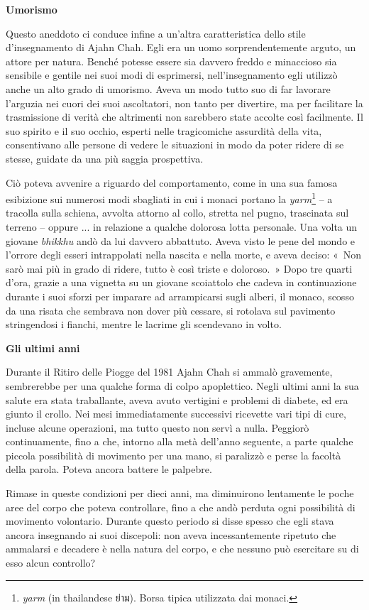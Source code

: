 \textbf{Umorismo}

Questo aneddoto ci conduce infine a un'altra caratteristica dello stile
d'insegnamento di Ajahn Chah. Egli era un uomo sorprendentemente arguto,
un attore per natura. Benché potesse essere sia davvero freddo e
minaccioso sia sensibile e gentile nei suoi modi di esprimersi,
nell'insegnamento egli utilizzò anche un alto grado di umorismo. Aveva
un modo tutto suo di far lavorare l'arguzia nei cuori dei suoi
ascoltatori, non tanto per divertire, ma per facilitare la trasmissione
di verità che altrimenti non sarebbero state accolte così facilmente. Il
suo spirito e il suo occhio, esperti nelle tragicomiche assurdità della
vita, consentivano alle persone di vedere le situazioni in modo da poter
ridere di se stesse, guidate da una più saggia prospettiva.

Ciò poteva avvenire a riguardo del comportamento, come in una sua famosa
esibizione sui numerosi modi sbagliati in cui i monaci portano la
\emph{yarm}\footnote{\emph{yarm} (in thailandese ย่าม). Borsa tipica
  utilizzata dai monaci.} -- a tracolla sulla schiena, avvolta attorno
al collo, stretta nel pugno, trascinata sul terreno -- oppure ... in
relazione a qualche dolorosa lotta personale. Una volta un giovane
\emph{bhikkhu} andò da lui davvero abbattuto. Aveva visto le pene del
mondo e l'orrore degli esseri intrappolati nella nascita e nella morte,
e aveva deciso: «~Non sarò mai più in grado di ridere, tutto è così
triste e doloroso.~» Dopo tre quarti d'ora, grazie a una vignetta su un
giovane scoiattolo che cadeva in continuazione durante i suoi sforzi per
imparare ad arrampicarsi sugli alberi, il monaco, scosso da una risata
che sembrava non dover più cessare, si rotolava sul pavimento
stringendosi i fianchi, mentre le lacrime gli scendevano in volto.

\textbf{Gli ultimi anni}

Durante il Ritiro delle Piogge del 1981 Ajahn Chah si ammalò gravemente,
sembrerebbe per una qualche forma di colpo apoplettico. Negli ultimi
anni la sua salute era stata traballante, aveva avuto vertigini e
problemi di diabete, ed era giunto il crollo. Nei mesi immediatamente
successivi ricevette vari tipi di cure, incluse alcune operazioni, ma
tutto questo non servì a nulla. Peggiorò continuamente, fino a che,
intorno alla metà dell'anno seguente, a parte qualche piccola
possibilità di movimento per una mano, si paralizzò e perse la facoltà
della parola. Poteva ancora battere le palpebre.

Rimase in queste condizioni per dieci anni, ma diminuirono lentamente le
poche aree del corpo che poteva controllare, fino a che andò perduta
ogni possibilità di movimento volontario. Durante questo periodo si
disse spesso che egli stava ancora insegnando ai suoi discepoli: non
aveva incessantemente ripetuto che ammalarsi e decadere è nella natura
del corpo, e che nessuno può esercitare su di esso alcun controllo?

